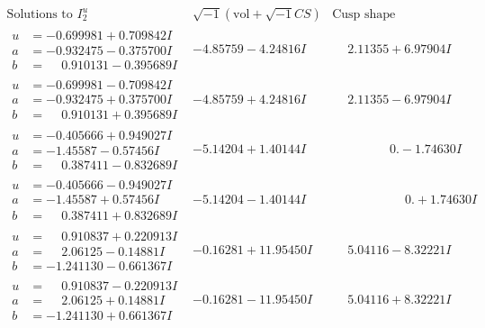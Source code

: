 \documentclass[1p]{elsarticle_modified}
\theoremstyle{definition}
\newcommand{\I}{\sqrt{-1}}
\begin{document}
$$\begin{array}{c|c|c}  
\text{Solutions to }I^u_{2}& \I (\text{vol} + \sqrt{-1}CS) & \text{Cusp shape}\\
 \hline 
\begin{aligned}
u &= -0.699981 + 0.709842 I \\
a &= -0.932475 - 0.375700 I \\
b &= \phantom{-}0.910131 - 0.395689 I\end{aligned}
 & -4.85759 - 4.24816 I & \phantom{-}2.11355 + 6.97904 I \\ \hline\begin{aligned}
u &= -0.699981 - 0.709842 I \\
a &= -0.932475 + 0.375700 I \\
b &= \phantom{-}0.910131 + 0.395689 I\end{aligned}
 & -4.85759 + 4.24816 I & \phantom{-}2.11355 - 6.97904 I \\ \hline\begin{aligned}
u &= -0.405666 + 0.949027 I \\
a &= -1.45587 - 0.57456 I \\
b &= \phantom{-}0.387411 - 0.832689 I\end{aligned}
 & -5.14204 + 1.40144 I & \phantom{-0.000000 } 0. - 1.74630 I \\ \hline\begin{aligned}
u &= -0.405666 - 0.949027 I \\
a &= -1.45587 + 0.57456 I \\
b &= \phantom{-}0.387411 + 0.832689 I\end{aligned}
 & -5.14204 - 1.40144 I & \phantom{-0.000000 -}0. + 1.74630 I \\ \hline\begin{aligned}
u &= \phantom{-}0.910837 + 0.220913 I \\
a &= \phantom{-}2.06125 - 0.14881 I \\
b &= -1.241130 - 0.661367 I\end{aligned}
 & -0.16281 + 11.95450 I & \phantom{-}5.04116 - 8.32221 I \\ \hline\begin{aligned}
u &= \phantom{-}0.910837 - 0.220913 I \\
a &= \phantom{-}2.06125 + 0.14881 I \\
b &= -1.241130 + 0.661367 I\end{aligned}
 & -0.16281 - 11.95450 I & \phantom{-}5.04116 + 8.32221 I \\ \hline\begin{aligned}

\end{aligned}
\end{array}$$
\end{document}

